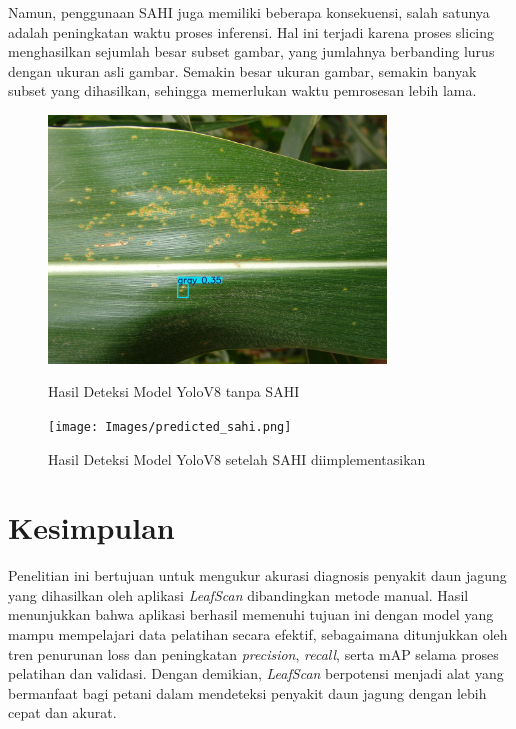 \documentclass[journal,article,submit,pdftex,moreauthors]{Definitions/mdpi}
\begin{document}
Namun, penggunaan SAHI juga memiliki beberapa konsekuensi, salah satunya adalah peningkatan waktu proses inferensi. Hal ini terjadi karena proses slicing menghasilkan sejumlah besar subset gambar, yang jumlahnya berbanding lurus dengan ukuran asli gambar. Semakin besar ukuran gambar, semakin banyak subset yang dihasilkan, sehingga memerlukan waktu pemrosesan lebih lama.

 \begin{figure}[H]
            \centering
            \begin{minipage}{0.45\textwidth}
                \centering
                \includegraphics[width=0.8\textwidth]{Images/predicted_0.jpg}
                \caption{\centering Hasil Deteksi Model YoloV8 tanpa SAHI}
                \label{fig:login-view}
            \end{minipage}
            \hfill
            \begin{minipage}{0.45\textwidth}
                \centering
                \texttt{[image: Images/predicted\_sahi.png]}
                \caption{\centering Hasil Deteksi Model YoloV8 setelah SAHI diimplementasikan}
                \label{fig:register-view}
            \end{minipage}
        \end{figure}
\section{Kesimpulan}
Penelitian ini bertujuan untuk mengukur akurasi diagnosis penyakit daun jagung yang dihasilkan oleh aplikasi \textit{LeafScan} dibandingkan metode manual. Hasil menunjukkan bahwa aplikasi berhasil memenuhi tujuan ini dengan model yang mampu mempelajari data pelatihan secara efektif, sebagaimana ditunjukkan oleh tren penurunan loss dan peningkatan \textit{precision}, \textit{recall}, serta mAP selama proses pelatihan dan validasi. Dengan demikian, \textit{LeafScan} berpotensi menjadi alat yang bermanfaat bagi petani dalam mendeteksi penyakit daun jagung dengan lebih cepat dan akurat.
\end{document}
